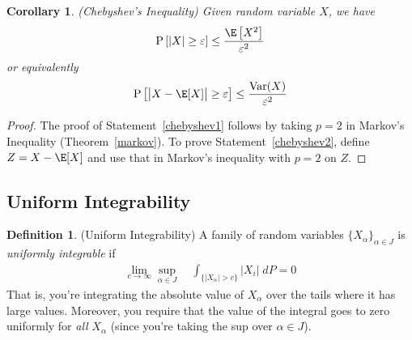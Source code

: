 \documentclass[12pt]{article}
\theoremstyle{plain}
\newtheorem{cor}[thm]{Corollary}
\theoremstyle{definition}
\newtheorem{defn}[thm]{Definition}
\theoremstyle{remark}
\newcommand{\ra}{\rightarrow}
\newcommand{\Prb}{\operatorname{P}}
\newcommand{\Var}{\operatorname{Var}}
\begin{document}
\begin{cor}{\emph{(Chebyshev's Inequality)}}
Given random variable $X$, we have
\begin{equation}
  \label{chebyshev1}
  \Prb\left[
    \left\lvert X\right\rvert
    \geq \varepsilon\right]
  \leq \frac{\E\left[X^2\right]}{\varepsilon^2}
\end{equation}
or equivalently
\begin{equation}
  \label{chebyshev2}
  \Prb\left[
    \big\lvert X-\E[X]\big\rvert
    \geq \varepsilon\right]
  \leq \frac{\Var(X)}{\varepsilon^2}
\end{equation}
\end{cor}
\begin{proof}
The proof of Statement~\ref{chebyshev1} follows by taking $p=2$ in
Markov's Inequality (Theorem~\ref{markov}).
To prove Statement~\ref{chebyshev2}, define $Z=X-\E[X]$ and use that in
Markov's inequality with $p=2$ on $Z$.
\end{proof}

\clearpage
\subsection{Uniform Integrability}

\begin{defn}(Uniform Integrability)
A family of random variables $\{X_\alpha\}_{\alpha \in J}$ is
\emph{uniformly integrable} if
\begin{align*}
  \lim_{c\ra\infty} \sup_{\alpha\in J}\quad
  \int_{\{|X_\alpha|>c\}}
  |X_i|\; dP = 0
\end{align*}
That is, you're integrating the absolute value of $X_\alpha$ over the
tails where it has large values. Moreover, you require that the value
of the integral goes to zero uniformly for \emph{all} $X_\alpha$ (since
you're taking the sup over $\alpha \in J$).
\end{defn}
\end{document}
